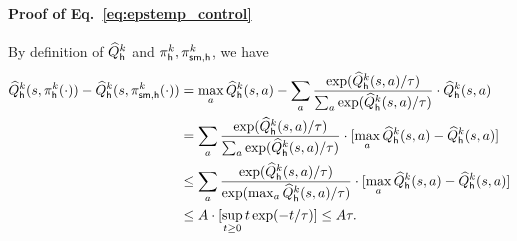  \paragraph{Proof of Eq.~\eqref{eq:epstemp_control}}
 By definition of ${\widehat{{Q}}}_{\mathsf{h}}^k$ and ${\pi}_{\mathsf{h}}^k,{\pi}^k_{{\mathsf{sm}},{\mathsf{h}}}$, we have
 \begin{align*}
     {\widehat{{Q}}}^k_{\mathsf{h}}({s},{\pi}^k_{{\mathsf{h}}}(\cdot))-{\widehat{{Q}}}^k_{\mathsf{h}}({s},{\pi}^k_{{\mathsf{sm}},{\mathsf{h}}}(\cdot)) &=\max_{{a}} {\widehat{{Q}}}^k_{\mathsf{h}}({s},{a})-
\sum_{{a}}\frac{\exp({\widehat{{Q}}}^k_{\mathsf{h}}({s},{a})/{\tau})}{\sum_{a} \exp({\widehat{{Q}}}^k_{\mathsf{h}}({s},{a})/{\tau})}\cdot{\widehat{{Q}}}^k_{\mathsf{h}}({s},{a})\\
&=
\sum_{{a}}\frac{\exp({\widehat{{Q}}}^k_{\mathsf{h}}({s},{a})/{\tau})}{\sum_{a} \exp({\widehat{{Q}}}^k_{\mathsf{h}}({s},{a})/{\tau})}\cdot[\max_{{a}} {\widehat{{Q}}}^k_{\mathsf{h}}({s},{a})-{\widehat{{Q}}}^k_{\mathsf{h}}({s},{a})]\\
&\leq
\sum_{{a}}\frac{\exp({\widehat{{Q}}}^k_{\mathsf{h}}({s},{a})/{\tau})}{ \exp(\max_{a}{\widehat{{Q}}}^k_{\mathsf{h}}({s},{a})/{\tau})}\cdot[\max_{{a}} {\widehat{{Q}}}^k_{\mathsf{h}}({s},{a})-{\widehat{{Q}}}^k_{\mathsf{h}}({s},{a})]\\
&\leq {A} \cdot [\sup_{t\geq 0}t\exp(-t/{\tau})]\leq{A}{\tau}.
 \end{align*} 